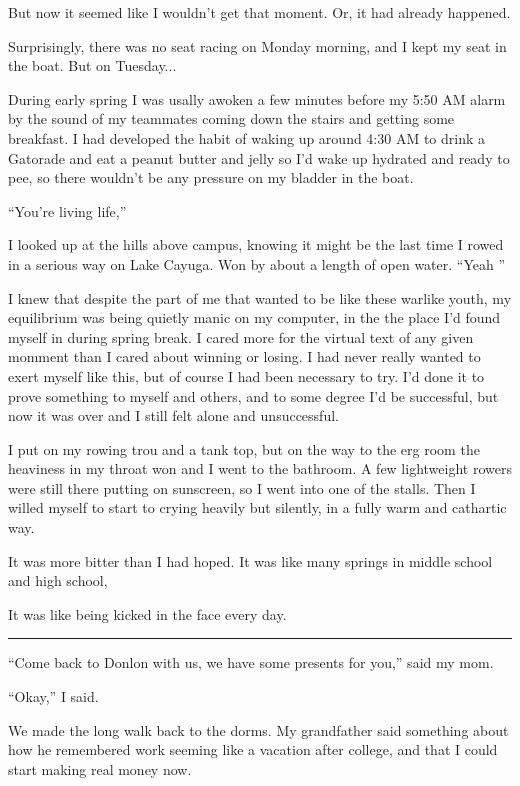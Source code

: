 But now it seemed like I wouldn't get that moment.  Or, it had already happened.

Surprisingly, there was no seat racing on Monday morning, and I kept my seat in
the boat.  But on Tuesday...

During early spring I was usally awoken a few minutes before my 5:50 AM alarm by
the sound of my teammates coming down the stairs and getting some breakfast.  I
had developed the habit of waking up around 4:30 AM to drink a Gatorade and eat
a peanut butter and jelly so I'd wake up hydrated and ready to pee, so there
wouldn't be any pressure on my bladder in the boat. 

``You're living life,''

I looked up at the hills above campus, knowing it might be the last time I rowed
in a serious way on Lake Cayuga.  Won by about a length of open water.  ``Yeah
'' 

I knew that despite the part of me that wanted to be like these warlike youth,
my equilibrium was being quietly manic on my computer, in the the place I'd
found myself in during spring break.  I cared more for the virtual text of any
given momment than I cared about winning or losing.  I had never really wanted
to exert myself like this, but of course I had been necessary to try.  I'd done
it to prove something to myself and others, and to some degree I'd be
successful, but now it was over and I still felt alone and unsuccessful.

I put on my rowing trou and a tank top, but on the way to the erg room the
heaviness in my throat won and I went to the bathroom.  A few lightweight
rowers were still there putting on sunscreen, so I went into one of the stalls.
Then I willed myself to start to crying heavily but silently, in a fully warm
and cathartic way.  

It was more bitter than I had hoped.  It was like many springs in middle school
and high school, 

It was like being kicked in the face every day.

\plainfancybreak{12pt}{2}{* * *}

``Come back to Donlon with us, we have some presents for you,'' said my mom. 

``Okay,'' I said.  

We made the long walk back to the dorms.  My grandfather said something about
how he remembered work seeming like a vacation after college, and that I could
start making real money now.

